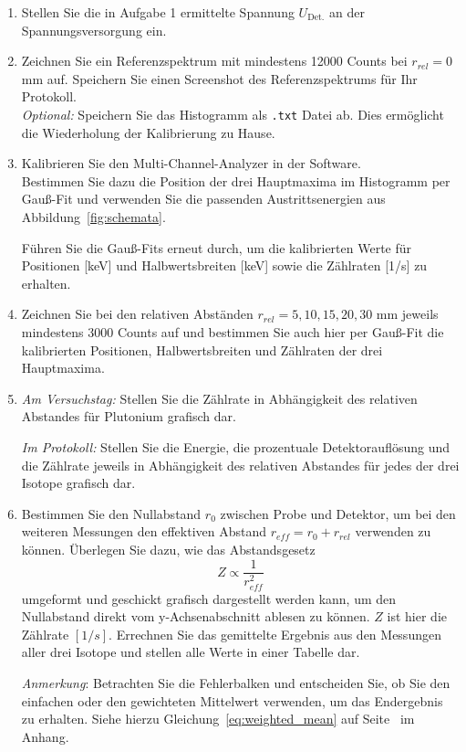 \begin{enumerate}[label=\textbf{\alph*)}]
	\item Stellen Sie die in Aufgabe 1 ermittelte Spannung $U_{\text{Det.}}$ an der Spannungsversorgung ein.
	\item Zeichnen Sie ein Referenzspektrum mit mindestens 12000 Counts bei $r_{rel} = 0$ mm auf. Speichern Sie einen Screenshot des Referenzspektrums für Ihr Protokoll.
		\\ \textit{Optional:} Speichern Sie das Histogramm als \verb|.txt| Datei ab. Dies ermöglicht die Wiederholung der Kalibrierung zu Hause. 
	\item Kalibrieren Sie den Multi-Channel-Analyzer in der Software. \\Bestimmen Sie dazu die Position der drei Hauptmaxima im Histogramm per Gauß-Fit und verwenden Sie die passenden Austrittsenergien aus Abbildung~\ref{fig:schemata}.
	
	Führen Sie die Gauß-Fits erneut durch, um die kalibrierten Werte für Positionen [keV] und Halbwertsbreiten [keV] sowie die Zählraten [1/s] zu erhalten.
	\item Zeichnen Sie bei den relativen Abständen $r_{rel} = 5, 10, 15, 20, 30$ mm jeweils mindestens 3000 Counts auf und bestimmen Sie auch hier per Gauß-Fit die kalibrierten Positionen, Halbwertsbreiten und Zählraten der drei Hauptmaxima.
	\item \textit{Am Versuchstag:} Stellen Sie die Zählrate in Abhängigkeit des relativen Abstandes für Plutonium grafisch dar.
	
	\textit{Im Protokoll:} Stellen Sie die Energie, die prozentuale Detektorauflösung und die Zählrate  jeweils in Abhängigkeit des relativen Abstandes für jedes der drei Isotope grafisch dar.
	\item Bestimmen Sie den Nullabstand $r_0$ zwischen Probe und Detektor, um bei den weiteren Messungen den effektiven Abstand $r_{eff} = r_0 + r_{rel}$ verwenden zu können. Überlegen Sie dazu, wie das Abstandsgesetz
	\begin{equation}
		Z \propto \frac{1}{r^2_{eff}}
	\end{equation}
	umgeformt und geschickt grafisch dargestellt werden kann, um den Nullabstand direkt vom y-Achsenabschnitt ablesen zu können. $Z$ ist hier die Zählrate $[1/s]$. Errechnen Sie das gemittelte Ergebnis aus den Messungen aller drei Isotope und stellen alle Werte in einer Tabelle dar.

    \textit{Anmerkung}: Betrachten Sie die Fehlerbalken und entscheiden Sie, ob Sie den einfachen oder den gewichteten Mittelwert verwenden, um das Endergebnis zu erhalten. Siehe hierzu Gleichung~\eqref{eq:weighted_mean} auf Seite~\pageref{eq:weighted_mean} im Anhang.
	

\end{enumerate}

